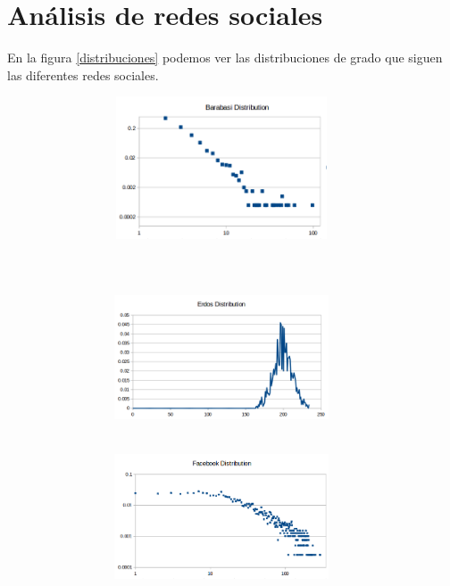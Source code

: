 \documentclass[spanish]{assignment}
\begin{document}
	\section{Análisis de redes sociales}
	
	En la figura \ref{distribuciones} podemos ver las distribuciones de grado que siguen las diferentes redes sociales.
	
	\begin{figure}[ht!]
		\begin{subfigure}[t!]{\textwidth}
			\begin{subfigure}[t!]{\textwidth}
				\centering
				\includegraphics[width=180pt, height=120pt]{img/barabasi_dl.png}
			\end{subfigure}\\
			\begin{subfigure}[t!]{\textwidth}
				\centering
				\includegraphics[width=180pt, height=120pt]{img/erdos_d.png}
			\end{subfigure}
		\end{subfigure}
		\begin{subfigure}[t!]{\textwidth}
			\begin{subfigure}[t!]{\textwidth}
				\centering
				\includegraphics[width=180pt, height=120pt]{img/facebook_dl.png}

\end{subfigure}
\end{subfigure}
\end{figure}
\end{document}
